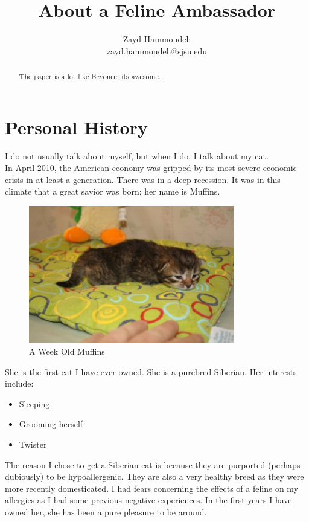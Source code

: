 \documentclass{article}
\title{About a Feline Ambassador}
\author{
	Zayd Hammoudeh \\
	zayd.hammoudeh@sjsu.edu
}
\begin{document}
\maketitle

\begin{abstract}
The paper is a lot like Beyonce; its awesome.
\end{abstract}

\section{Personal History}\label{my_history}
I do not usually talk about myself, but when I do, I talk about my cat.\\

In April 2010, the American economy was gripped by its most severe economic crisis in at least a generation.  There was in a deep recession.  It was in this climate that a great savior was born; her name is Muffins.  

\begin{figure}[ht!]
\centering
\includegraphics[width=90mm]{./images/muffins.jpg}
\caption{A Week Old Muffins}
\end{figure}

She is the first cat I have ever owned.  She is a purebred Siberian.  Her interests include: \\
\begin{itemize}
	\item Sleeping
	\item Grooming herself
	\item Twister
\end{itemize}

The reason I chose to get a Siberian cat is because they are purported (perhaps dubiously) to be hypoallergenic. They are also a very healthy breed as they were more recently domesticated.  I had fears concerning the effects of a feline on my allergies as I had some previous negative experiences.  In the first years I have owned her, she has been a pure pleasure to be around.
\end{document}
